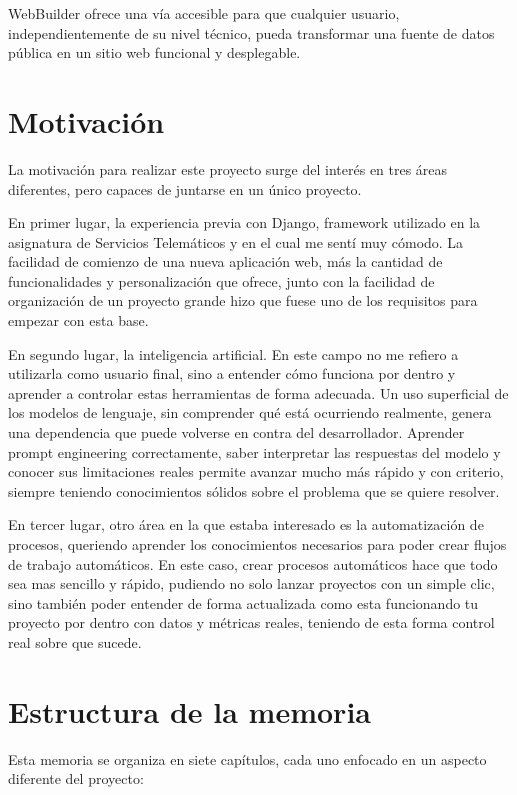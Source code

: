 WebBuilder ofrece una vía accesible para que cualquier usuario, independientemente de su nivel técnico, pueda transformar una fuente de datos pública en un sitio web funcional y desplegable. 


\section{Motivación}
\label{sec:motivacion}

La motivación para realizar este proyecto surge del interés en tres áreas diferentes, pero capaces de juntarse en un único proyecto.

En primer lugar, la experiencia previa con Django, framework utilizado en la asignatura de Servicios Telemáticos y en el cual me sentí muy cómodo. La facilidad de comienzo de una nueva aplicación web, más la cantidad de funcionalidades y personalización que ofrece, junto con la facilidad de organización de un proyecto grande hizo que fuese uno de los requisitos para empezar con esta base.

En segundo lugar, la inteligencia artificial. En este campo no me refiero a utilizarla como usuario final, sino a entender cómo funciona por dentro y aprender a controlar estas herramientas de forma adecuada. Un uso superficial de los modelos de lenguaje, sin comprender qué está ocurriendo realmente, genera una dependencia que puede volverse en contra del desarrollador. Aprender prompt engineering correctamente, saber interpretar las respuestas del modelo y conocer sus limitaciones reales permite avanzar mucho más rápido y con criterio, siempre teniendo conocimientos sólidos sobre el problema que se quiere resolver.

En tercer lugar, otro área en la que estaba interesado es la automatización de procesos, queriendo aprender los conocimientos necesarios para poder crear flujos de trabajo automáticos. En este caso, crear procesos automáticos hace que todo sea mas sencillo y rápido, pudiendo no solo lanzar proyectos con un simple clic, sino también poder entender de forma actualizada como esta funcionando tu proyecto por dentro con datos y métricas reales, teniendo de esta forma control real sobre que sucede.


\section{Estructura de la memoria}
\label{sec:estructura}

Esta memoria se organiza en siete capítulos, cada uno enfocado en un aspecto diferente del proyecto:

